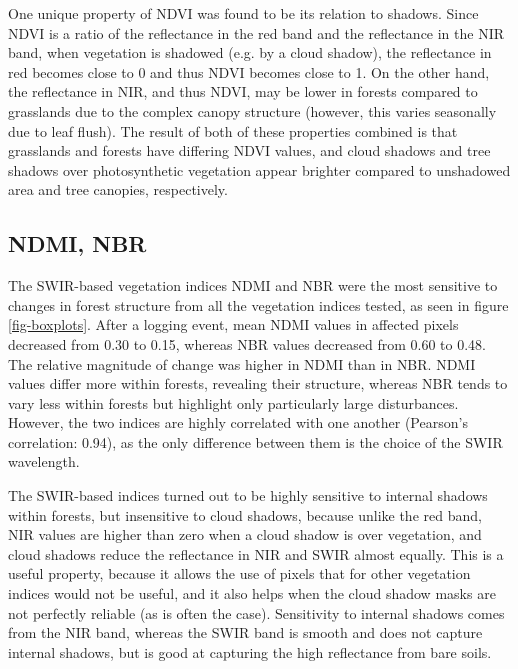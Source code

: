 \documentclass[a4paper,12pt]{scrbook}
\begin{document}
One unique property of \ac{NDVI} was found to be its relation to shadows. Since \ac{NDVI} is a ratio of the reflectance in the red band and the reflectance in the \ac{NIR} band, when vegetation is shadowed (e.g. by a cloud shadow), the reflectance in red becomes close to 0 and thus \ac{NDVI} becomes close to 1. On the other hand, the reflectance in \ac{NIR}, and thus \ac{NDVI}, may be lower in forests compared to grasslands due to the complex canopy structure (however, this varies seasonally due to leaf flush). The result of both of these properties combined is that grasslands and forests have differing \ac{NDVI} values, and cloud shadows and tree shadows over photosynthetic vegetation appear brighter compared to unshadowed area and tree canopies, respectively.

\subsection{NDMI, NBR}

The \ac{SWIR}-based vegetation indices \ac{NDMI} and \ac{NBR} were the most sensitive to changes in forest structure from all the vegetation indices tested, as seen in figure \ref{fig-boxplots}. After a logging event, mean \ac{NDMI} values in affected pixels decreased from 0.30 to 0.15, whereas \ac{NBR} values decreased from 0.60 to 0.48. The relative magnitude of change was higher in \ac{NDMI} than in \ac{NBR}. \ac{NDMI} values differ more within forests, revealing their structure, whereas \ac{NBR} tends to vary less within forests but highlight only particularly large disturbances. However, the two indices are highly correlated with one another (Pearson's correlation: 0.94), as the only difference between them is the choice of the \ac{SWIR} wavelength.

The \ac{SWIR}-based indices turned out to be highly sensitive to internal shadows within forests, but insensitive to cloud shadows, because unlike the red band, \ac{NIR} values are higher than zero when a cloud shadow is over vegetation, and cloud shadows reduce the reflectance in \ac{NIR} and \ac{SWIR} almost equally. This is a useful property, because it allows the use of pixels that for other vegetation indices would not be useful, and it also helps when the cloud shadow masks are not perfectly reliable (as is often the case). Sensitivity to internal shadows comes from the \ac{NIR} band, whereas the \ac{SWIR} band is smooth and does not capture internal shadows, but is good at capturing the high reflectance from bare soils.
\end{document}
